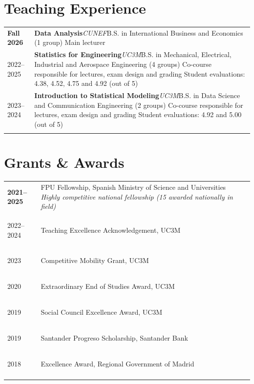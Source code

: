 \documentclass[10pt,a4paper]{article}
\makeatletter
\newenvironment{cvtable}
  {\begin{longtable}{@{} >{\raggedright\arraybackslash\bfseries}p{0.135\textwidth}
                        !{\color{rulegray}\vrule width 0.9pt}
                        >{\raggedright\arraybackslash}p{0.83\textwidth} @{}}}
  {\end{longtable}}
\newcommand{\cventry}[4]{%
  #1 & \textbf{#2}\hfill\textit{\color{mutedtext}#3}\newline #4
  \tabularnewline \noalign{\vskip 5pt}%
}
\newcommand{\cvitem}[2]{%
  #1 & #2 \tabularnewline \noalign{\vskip 4pt}%
}
\makeatother
\begin{document}
\section*{Teaching Experience}
\begin{cvtable}
    \cventry{Fall 2026}
    {Data Analysis}
    {CUNEF}
    {B.S. in International Business and Economics (1 group)\newline
    Main lecturer}

    \cventry{2022--2025}
    {Statistics for Engineering}
    {UC3M}
    {B.S. in Mechanical, Electrical, Industrial and Aerospace Engineering (4 groups)\newline
    Co-course responsible for lectures, exam design and grading\newline
    Student evaluations: 4.38, 4.52, 4.75 and 4.92 (out of 5)}

    \cventry{2023--2024}
    {Introduction to Statistical Modeling}
    {UC3M}
    {B.S. in Data Science and Communication Engineering (2 groups)\newline
    Co-course responsible for lectures, exam design and grading\newline
    Student evaluations: 4.92 and 5.00 (out of 5)}
\end{cvtable}

\section*{Grants \& Awards}
\begin{cvtable}
    \cvitem{2021--2025}{FPU Fellowship, Spanish Ministry of Science and Universities\newline
    \textit{\color{mutedtext}Highly competitive national fellowship (15 awarded nationally in field)}}
    \cvitem{2022--2024}{Teaching Excellence Acknowledgement, UC3M}
    \cvitem{2023}{Competitive Mobility Grant, UC3M}
    \cvitem{2020}{Extraordinary End of Studies Award, UC3M}
    \cvitem{2019}{Social Council Excellence Award, UC3M}
    \cvitem{2019}{Santander Progreso Scholarship, Santander Bank}
    \cvitem{2018}{Excellence Award, Regional Government of Madrid}
\end{cvtable}

\end{document}
